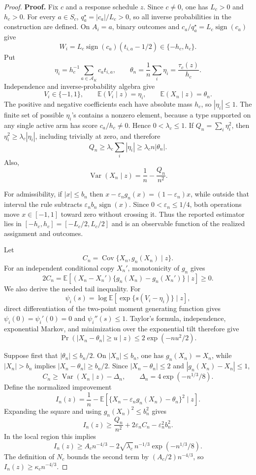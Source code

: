 \documentclass{article}
\begin{document}
\begin{proof}
\textbf{Proof.}
Fix \(c\) and a response schedule \(z\). Since \(c\neq0\), one has \(L_c>0\) and \(h_c>0\). For every \(a\in S_c\), \(q_a^\star=|c_a|/L_c>0\), so all inverse probabilities in the construction are defined. On \(A_i=a\), binary outcomes and \(c_a/q_a^\star=L_c\operatorname{sign}(c_a)\) give
\[
 W_i=L_c\operatorname{sign}(c_a)(t_{i,a}-1/2)\in\{-h_c,h_c\}.
\]
Put
\[
 \eta_i=h_c^{-1}\sum_{a\in\mathcal A_K}c_at_{i,a},
 \qquad
 \theta_n=\frac1n\sum_i\eta_i=\frac{\tau_c(z)}{h_c}.
\]
Independence and inverse-probability algebra give
\[
 V_i\in\{-1,1\},\qquad
 \mathbb E(V_i\mid z)=\eta_i,
 \qquad
 \mathbb E(X_n\mid z)=\theta_n.
\]
The positive and negative coefficients each have absolute mass \(h_c\), so \(|\eta_i|\leq1\). The finite set of possible \(\eta_i\)'s contains a nonzero element, because a type supported on any single active arm has score \(c_a/h_c\neq0\). Hence \(0<\lambda_c\leq1\). If \(Q_n=\sum_i\eta_i^2\), then \(\eta_i^2\geq\lambda_c|\eta_i|\), including trivially at zero, and therefore
\[
 Q_n\geq\lambda_c\sum_i|\eta_i|
 \geq\lambda_c n|\theta_n|.
\]
Also,
\[
 \operatorname{Var}(X_n\mid z)=\frac1n-\frac{Q_n}{n^2}.
\]

For admissibility, if \(|x|\leq b_n\) then \(x-\varepsilon_ng_n(x)=(1-\varepsilon_n)x\), while outside that interval the rule subtracts \(\varepsilon_nb_n\operatorname{sign}(x)\). Since \(0<\varepsilon_n\leq1/4\), both operations move \(x\in[-1,1]\) toward zero without crossing it. Thus the reported estimator lies in \([-h_c,h_c]=[-L_c/2,L_c/2]\) and is an observable function of the realized assignment and outcomes.

Let
\[
 C_n=\operatorname{Cov}\{X_n,g_n(X_n)\mid z\}.
\]
For an independent conditional copy \(X_n'\), monotonicity of \(g_n\) gives
\[
 2C_n=\mathbb E[(X_n-X_n')\{g_n(X_n)-g_n(X_n')\}\mid z]\geq0.
\]
We also derive the needed tail inequality. For
\[
 \psi_i(s)=\log\mathbb E[\exp\{s(V_i-\eta_i)\}\mid z],
\]
direct differentiation of the two-point moment generating function gives \(\psi_i(0)=\psi_i'(0)=0\) and \(\psi_i''(s)\leq1\). Taylor's formula, independence, exponential Markov, and minimization over the exponential tilt therefore give
\[
 \Pr(|X_n-\theta_n|\geq u\mid z)\leq2\exp(-nu^2/2).
\]

Suppose first that \(|\theta_n|\leq b_n/2\). On \(|X_n|\leq b_n\), one has \(g_n(X_n)=X_n\), while \(|X_n|>b_n\) implies \(|X_n-\theta_n|\geq b_n/2\). Since \(|X_n-\theta_n|\leq2\) and \(|g_n(X_n)-X_n|\leq1\),
\[
 C_n\geq\operatorname{Var}(X_n\mid z)-\Delta_n,
 \qquad
 \Delta_n=4\exp(-n^{1/3}/8).
\]
Define the normalized improvement
\[
 I_n(z)=\frac1n-
 \mathbb E[\{X_n-\varepsilon_ng_n(X_n)-\theta_n\}^2\mid z].
\]
Expanding the square and using \(g_n(X_n)^2\leq b_n^2\) gives
\[
 I_n(z)\geq\frac{Q_n}{n^2}+2\varepsilon_nC_n-\varepsilon_n^2b_n^2.
\]
In the local region this implies
\[
 I_n(z)\geq A_cn^{-4/3}
 -2\sqrt{\lambda_c}\,n^{-1/3}\exp(-n^{1/3}/8).
\]
The definition of \(N_c\) bounds the second term by \((A_c/2)n^{-4/3}\), so \(I_n(z)\geq\kappa_cn^{-4/3}\).


\end{proof}
\end{document}
